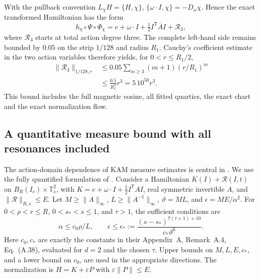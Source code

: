 With the pullback convention $L_\chi H=\{H,\chi\}$,
$\{\omega\cdot I,\chi\}=-D_\omega\chi$. Hence the exact transformed
Hamiltonian has the form
\begin{equation}
 h_\eta\circ\Psi\circ\Phi_\chi
 =e+\omega\cdot I+\tfrac12I^\mathsf T\overline A I+\mathcal R_3,
 \label{eq:measure-complete-tube-normal-form}
\end{equation}
where $\mathcal R_3$ starts at total action degree three. The complete
left-hand side remains bounded by $0.05$ on the strip $1/128$ and
radius $R_1$. Cauchy's coefficient estimate in the two action
variables therefore yields, for $0<r\leq R_1/2$,
\begin{equation}
 \begin{aligned}
 \|\mathcal R_3\|_{1/128,r}
 &\leq0.05\sum_{m\geq3}(m+1)(r/R_1)^m\\
 &\leq\frac{0.5}{R_1^3}r^3=5\,10^{50}r^3.
 \end{aligned}
 \label{eq:measure-complete-cauchy-remainder}
\end{equation}
This bound includes the full magnetic cosine, all fitted quartics,
the exact chart and the exact normalization flow.

\subsection{A quantitative measure bound with all resonances included}
\label{sec:measure-ck-bound}

The action-domain dependence of KAM measure estimates is central in
\citet{biasco2018measure}. We use the fully quantified formulation
of \citet[Theorems~1 and~3, Eqs.~(4), (9), (13)--(14)]{chierchia2021measure}.
Consider a Hamiltonian $K(I)+\mathcal R(I,t)$ on
$B_R(I_c)\times\mathbb T_s^2$, with
$K=e+\omega\cdot I+\tfrac12I^\mathsf TAI$, real symmetric invertible
$A$, and $\|\mathcal R\|_{R,s}\leq E$.
Let $M\geq\|A\|_\infty$, $L\geq\|A^{-1}\|_\infty$,
$\vartheta=ML$, and $\epsilon=ME/\alpha^2$.
For $0<\rho<r\leq R$, $0<s_*<s\leq1$, and $\tau>1$, the sufficient
conditions are
\begin{equation}
 \alpha\leq c_0\rho/L,\qquad
 \epsilon\leq\epsilon_*:=
 \frac{(s-s_*)^{7(\tau+1)+10}}{c_*\vartheta^6}.
 \label{eq:measure-ck-smallness}
\end{equation}
Here $c_0,c_*$ are exactly the constants in their Appendix~A,
Remark~A.4, Eq.~(A.38), evaluated for $d=2$ and the chosen $\tau$.
Upper bounds on $M,L,E,c_*$, and a lower bound on $c_0$, are used
in the appropriate directions. The normalization is
$H=K+\varepsilon P$ with $\varepsilon\|P\|\leq E$.

